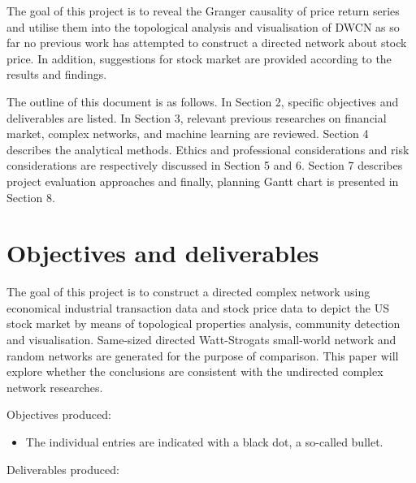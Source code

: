 
The goal of this project is to reveal the Granger causality of price return series and utilise them into the topological analysis and visualisation of DWCN as so far no previous work has attempted to construct a directed network about stock price. In addition, suggestions for stock market are provided according to the results and findings.

The outline of this document is as follows. In Section 2, specific objectives and deliverables are listed. In Section 3, relevant previous researches on financial market, complex networks, and machine learning are reviewed. Section 4 describes the analytical methods. Ethics and professional considerations and risk considerations are respectively discussed in Section 5 and 6. Section 7 describes project evaluation approaches and finally, planning Gantt chart is presented in Section 8.


\section{Objectives and deliverables}

The goal of this project is to construct a directed complex network using economical industrial transaction data and stock price data to depict the US stock market by means of topological properties analysis, community detection and visualisation. Same-sized directed Watt-Strogats small-world network and random networks are generated for the purpose of comparison. This paper will explore whether the conclusions are consistent with the undirected complex network researches.

\vline

Objectives produced:

\begin{itemize}
	\item The individual entries are indicated with a black dot, a so-called bullet.
\end{itemize}

\vline

Deliverables produced:

